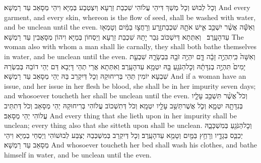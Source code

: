 {וְכָל לְבוּשׁ וְכָל מְשַׁךְ דִּיהֵי עֲלוֹהִי שִׁכְבַת זַרְעָא וְיִצְטְבַע בְּמַיָּא וִיהֵי מְסָאַב עַד רַמְשָׁא׃}
{And every garment, and every skin, whereon is the flow of seed, shall be washed with water, and be unclean until the even.}{}
{וְאִשָּׁ֕ה אֲשֶׁ֨ר יִשְׁכַּ֥ב אִ֛ישׁ אֹתָ֖הּ שִׁכְבַת\maqqaf זָ֑רַע וְרָחֲצ֣וּ בַמַּ֔יִם וְטָמְא֖וּ עַד\maqqaf הָעָֽרֶב׃ \petucha }
{וְאִתְּתָא דְּיִשְׁכּוֹב גְּבַר יָתַהּ שִׁכְבַת זַרְעָא וְיַסְחוֹן בְּמַיָּא וִיהוֹן מְסָאֲבִין עַד רַמְשָׁא׃}
{The woman also with whom a man shall lie carnally, they shall both bathe themselves in water, and be unclean until the even.}{}
{וְאִשָּׁה֙ כִּֽי\maqqaf תִהְיֶ֣ה זָבָ֔ה דָּ֛ם יִהְיֶ֥ה זֹבָ֖הּ בִּבְשָׂרָ֑הּ שִׁבְעַ֤ת יָמִים֙ תִּהְיֶ֣ה בְנִדָּתָ֔הּ וְכׇל\maqqaf הַנֹּגֵ֥עַ בָּ֖הּ יִטְמָ֥א עַד\maqqaf הָעָֽרֶב׃}
{וְאִתְּתָא אֲרֵי תְהֵי דָּיְבָא דַּם יְהֵי דוֹבַהּ בְּבִשְׂרַהּ שִׁבְעָא יוֹמִין תְּהֵי בְּרִיחוּקַהּ וְכָל דְּיִקְרַב בַּהּ יְהֵי מְסָאַב עַד רַמְשָׁא׃}
{And if a woman have an issue, and her issue in her flesh be blood, she shall be in her impurity seven days; and whosoever toucheth her shall be unclean until the even.}{}
{וְכֹל֩ אֲשֶׁ֨ר תִּשְׁכַּ֥ב עָלָ֛יו בְּנִדָּתָ֖הּ יִטְמָ֑א וְכֹ֛ל אֲשֶׁר\maqqaf תֵּשֵׁ֥ב עָלָ֖יו יִטְמָֽא׃}
{וְכֹל דְּתִשְׁכוֹב עֲלוֹהִי בְּרִיחוּקַהּ יְהֵי מְסָאַב וְכֹל דְּתִתֵּיב עֲלוֹהִי יְהֵי מְסָאַב׃}
{And every thing that she lieth upon in her impurity shall be unclean; every thing also that she sitteth upon shall be unclean.}{}
{וְכׇל\maqqaf הַנֹּגֵ֖עַ בְּמִשְׁכָּבָ֑הּ יְכַבֵּ֧ס בְּגָדָ֛יו וְרָחַ֥ץ בַּמַּ֖יִם וְטָמֵ֥א עַד\maqqaf הָעָֽרֶב׃}
{וְכָל דְּיִקְרַב בְּמִשְׁכְּבַהּ יְצַבַּע לְבוּשׁוֹהִי וְיַסְחֵי בְמַיָּא וִיהֵי מְסָאַב עַד רַמְשָׁא׃}
{And whosoever toucheth her bed shall wash his clothes, and bathe himself in water, and be unclean until the even.}{}
